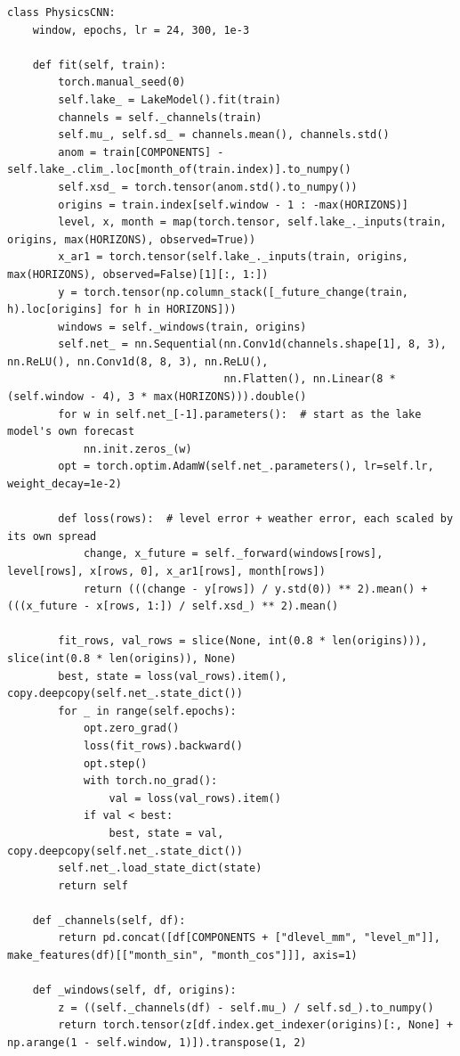 \documentclass{article}
\begin{document}
\begin{lstlisting}[caption={Physics-guided CNN and the list of models}]
class PhysicsCNN:
    window, epochs, lr = 24, 300, 1e-3

    def fit(self, train):
        torch.manual_seed(0)
        self.lake_ = LakeModel().fit(train)
        channels = self._channels(train)
        self.mu_, self.sd_ = channels.mean(), channels.std()
        anom = train[COMPONENTS] - self.lake_.clim_.loc[month_of(train.index)].to_numpy()
        self.xsd_ = torch.tensor(anom.std().to_numpy())
        origins = train.index[self.window - 1 : -max(HORIZONS)]
        level, x, month = map(torch.tensor, self.lake_._inputs(train, origins, max(HORIZONS), observed=True))
        x_ar1 = torch.tensor(self.lake_._inputs(train, origins, max(HORIZONS), observed=False)[1][:, 1:])
        y = torch.tensor(np.column_stack([_future_change(train, h).loc[origins] for h in HORIZONS]))
        windows = self._windows(train, origins)
        self.net_ = nn.Sequential(nn.Conv1d(channels.shape[1], 8, 3), nn.ReLU(), nn.Conv1d(8, 8, 3), nn.ReLU(),
                                  nn.Flatten(), nn.Linear(8 * (self.window - 4), 3 * max(HORIZONS))).double()
        for w in self.net_[-1].parameters():  # start as the lake model's own forecast
            nn.init.zeros_(w)
        opt = torch.optim.AdamW(self.net_.parameters(), lr=self.lr, weight_decay=1e-2)

        def loss(rows):  # level error + weather error, each scaled by its own spread
            change, x_future = self._forward(windows[rows], level[rows], x[rows, 0], x_ar1[rows], month[rows])
            return (((change - y[rows]) / y.std(0)) ** 2).mean() + (((x_future - x[rows, 1:]) / self.xsd_) ** 2).mean()

        fit_rows, val_rows = slice(None, int(0.8 * len(origins))), slice(int(0.8 * len(origins)), None)
        best, state = loss(val_rows).item(), copy.deepcopy(self.net_.state_dict())
        for _ in range(self.epochs):
            opt.zero_grad()
            loss(fit_rows).backward()
            opt.step()
            with torch.no_grad():
                val = loss(val_rows).item()
            if val < best:
                best, state = val, copy.deepcopy(self.net_.state_dict())
        self.net_.load_state_dict(state)
        return self

    def _channels(self, df):
        return pd.concat([df[COMPONENTS + ["dlevel_mm", "level_m"]], make_features(df)[["month_sin", "month_cos"]]], axis=1)

    def _windows(self, df, origins):
        z = ((self._channels(df) - self.mu_) / self.sd_).to_numpy()
        return torch.tensor(z[df.index.get_indexer(origins)[:, None] + np.arange(1 - self.window, 1)]).transpose(1, 2)


\end{lstlisting}
\end{document}
